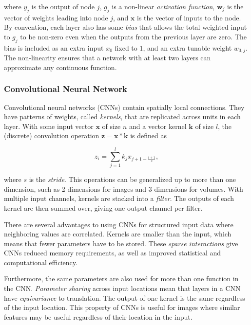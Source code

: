 where \(y_j\) is the output of node \(j\), \(g_j\) is a non-linear \textit{activation function}, \(\mathbf{w}_j\) is the vector of weights leading into node \(j\), and \(\mathbf{x}\) is the vector of inputs to the node.
By convention, each layer also has some \textit{bias} that allows the total weighted input to \(g_j\) to be non-zero even when the outputs from the previous layer are zero.
The bias is included as an extra input \(x_0\) fixed to 1, and an extra tunable weight \(w_{0,j}\).
The non-linearity ensures that a network with at least two layers can approximate any continuous function.~\cite{russell_artificial_2021}

\subsubsection{Convolutional Neural Network}

Convolutional neural networks (CNNs) contain spatially local connections.
They have patterns of weights, called \textit{kernels}, that are replicated across units in each layer.
With some input vector \(\mathbf{x}\) of size \(n\) and a vector kernel \(\mathbf{k}\) of size \(l\), the (discrete) convolution operation \(\mathbf{z} = \mathbf{x} \ast \mathbf{k}\) is defined as

\begin{equation}
    z_i = \sum_{j=1}^l k_j x_{j+1-\frac{l+1}{s}},
\end{equation}

where \(s\) is the \textit{stride}.
This operations can be generalized up to more than one dimension, such as 2 dimensions for images and 3 dimensions for volumes.
With multiple input channels, kernels are stacked into a \textit{filter}.
The outputs of each kernel are then summed over, giving one output channel per filter.

There are several advantages to using CNNs for structured input data where neighboring values are correlated.
Kernels are smaller than the input, which means that fewer parameters have to be stored.
These \textit{sparse interactions} give CNNs reduced memory requirements,
as well as improved statistical and computational efficiency.

Furthermore, the same parameters are also used for more than one function in the CNN. \textit{Parameter sharing} across input locations mean that layers in a CNN have \textit{equivariance} to translation. 
The output of one kernel is the same regardless of the input location.
This property of CNNs is useful for images where similar features may be useful regardless of their location in the input.~\cite{goodfellow_deep_2016}

